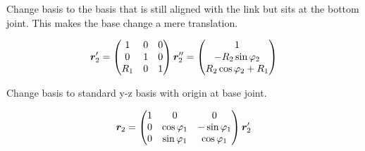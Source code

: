 \medskip
Change basis to the basis that is still aligned with the link but sits at the bottom joint.
This makes the base change a mere translation.

\noindent
\begin{minipage}{0.35\textwidth}
  \centering
\end{minipage}\hfill
\begin{minipage}{0.6\textwidth}
  \[
    \bm{r}_2^{\prime} =
    \begin{pmatrix}
      1   & 0 & 0 \\
      0   & 1 & 0 \\
      R_1 & 0 & 1
    \end{pmatrix}
    \bm{r}_2^{\prime\prime}
    =
    \begin{pmatrix} 1 \\ -R_2\sin\varphi_2 \\ R_2\cos\varphi_2 + R_1 \end{pmatrix}
  \]
\end{minipage}

\medskip
Change basis to standard y-z basis with origin at base joint.

\noindent
\begin{minipage}{0.35\textwidth}
  \centering
\end{minipage}\hfill
\begin{minipage}{0.6\textwidth}
  \[
    \bm{r}_2 =
    \begin{pmatrix}
      1 & 0 & 0 \\
      0 & \cos\varphi_1 & -\sin\varphi_1 \\
      0 & \sin\varphi_1 & \cos\varphi_1
    \end{pmatrix}
    \bm{r}_2^{\prime}
  \]
\end{minipage}


